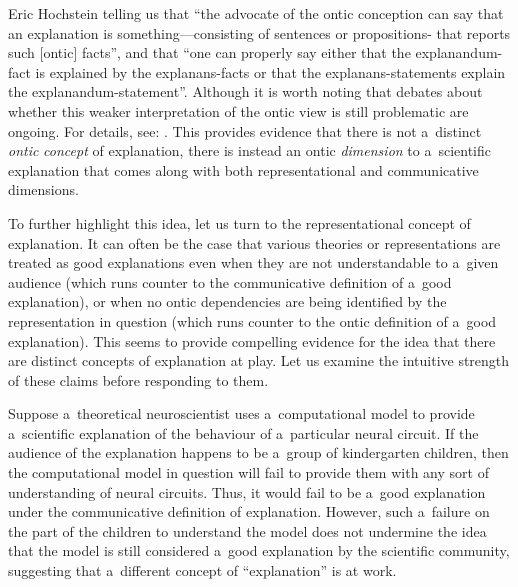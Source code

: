 \begin{artengenv}{Eric Hochstein}
{%
\parencite*[][p.86]{salmon_four_1989} %
 telling us that ``the advocate of the ontic conception can say that an explanation is something---consisting of sentences or propositions- that reports such [ontic] facts'', and that ``one can properly say either that the explanandum-fact is explained by the explanans-facts or that the explanans-statements explain the explanandum-statement''. Although it is worth noting that debates about whether this weaker interpretation of the ontic view is still problematic are ongoing. For details, see: 
\parencites[][]{illari_mechanistic_2013}[][]{wright_ontic_2018}.%
} This provides evidence that there is not a~distinct \textit{ontic} \textit{concept} of explanation, there is instead an ontic \textit{dimension} to a~scientific explanation that comes along with both representational and communicative dimensions.

To further highlight this idea, let us turn to the representational concept of explanation. It can often be the case that various theories or representations are treated as good explanations even when they are not understandable to a~given audience (which runs counter to the communicative definition of a~good explanation), or when no ontic dependencies are being identified by the representation in question (which runs counter to the ontic definition of a~good explanation). This seems to provide compelling evidence for the idea that there are distinct concepts of explanation at play. Let us examine the intuitive strength of these claims before responding to them.

Suppose a~theoretical neuroscientist uses a~computational model to provide a~scientific explanation of the behaviour of a~particular neural circuit. If the audience of the explanation happens to be a~group of kindergarten children, then the computational model in question will fail to provide them with any sort of understanding of neural circuits. Thus, it would fail to be a~good explanation under the communicative definition of explanation. However, such a~failure on the part of the children to understand the model does not undermine the idea that the model is still considered a~good explanation by the scientific community, suggesting that a~different concept of ``explanation'' is at work.


\end{artengenv}
